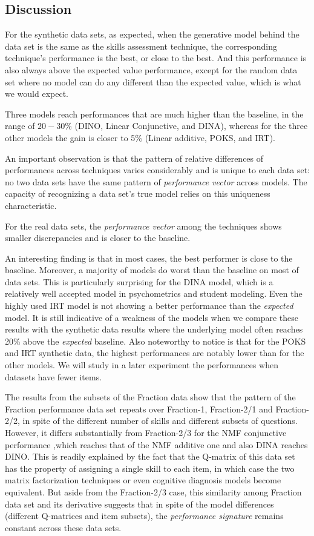\subsection{Discussion}

For the synthetic data sets, as expected, when the generative model behind the data set is the same as the skills assessment technique, the corresponding technique's performance is the best, or close to the best. And this performance is also always above the expected value performance, except for the random data set where no model can do any different than the expected value, which is what we would expect.

Three models reach performances that are much higher than the baseline, in the range of $20-30$\% (DINO, Linear Conjunctive, and DINA), whereas for the three other models the gain is closer to 5\% (Linear additive, POKS, and IRT).

An important observation is that the pattern of relative differences of performances across techniques varies considerably and is unique to each data set: no two data sets have the same pattern of \textit{performance vector} across models. The capacity of recognizing a data set's true model relies on this uniqueness characteristic.

For the real data sets, the \textit{performance vector} among the techniques shows smaller discrepancies and is closer to the baseline. 

An interesting finding is that in most cases, the best performer is close to the baseline. Moreover, a majority of models do worst than the baseline on most of data sets. This is particularly surprising for the DINA model, which is a relatively well accepted model in psychometrics and student modeling. Even the highly used IRT model is not showing a better performance than the \textit{expected} model. It is still indicative of a weakness of the models when we compare these results with the synthetic data results where the underlying model often reaches 20\% above the \textit{expected} baseline. Also noteworthy to notice is that for the POKS and IRT synthetic data, the highest performances are notably lower than for the other models. We will study in a later experiment the performances when datasets have fewer items.

The results from the subsets of the Fraction data show that the pattern of the Fraction performance data set repeats over Fraction-1, Fraction-2/1 and Fraction-2/2, in spite of the different number of skills and different subsets of questions. However, it differs substantially from Fraction-2/3 for the NMF conjunctive performance ,which reaches that of the NMF additive one and also DINA reaches DINO. This is readily explained by the fact that the Q-matrix of this data set has the property of assigning a single skill to each item, in which case the two matrix factorization techniques or even cognitive diagnosis models become equivalent. But aside from the Fraction-2/3 case, this similarity among Fraction data set and its derivative suggests that in spite of the model differences (different Q-matrices and item subsets), the \textit{performance signature} remains constant across these data sets.

